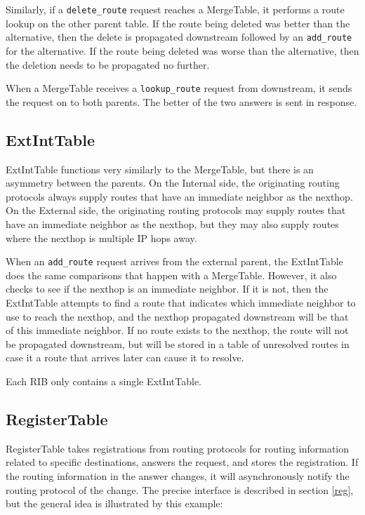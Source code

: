 \documentclass[11pt]{article}
\begin{document}
Similarly, if a {\tt delete\_route} request reaches a MergeTable, it
performs a route lookup on the other parent table.  If the route being
deleted was better than the alternative, then the delete is propagated
downstream followed by an {\tt add\_route} for the alternative.  If the
route being deleted was worse than the alternative, then the deletion
needs to be propagated no further.

When a MergeTable receives a {\tt lookup\_route} request from
downstream, it sends the request on to both parents.  The better of
the two answers is sent in response.

\subsection{ExtIntTable}

ExtIntTable functions very similarly to the MergeTable, but there is
an asymmetry between the parents.  On the Internal side, the
originating routing protocols always supply routes that have an
immediate neighbor as the nexthop.  On the External side, the
originating routing protocols may supply routes that have an immediate
neighbor as the nexthop, but they may also supply routes where the
nexthop is multiple IP hops away.  

When an {\tt add\_route} request arrives from the external parent, the
ExtIntTable does the same comparisons that happen with a MergeTable.
However, it also checks to see if the nexthop is an immediate
neighbor.  If it is not, then the ExtIntTable attempts to find a route
that indicates which immediate neighbor to use to reach the nexthop,
and the nexthop propagated downstream will be that of this immediate
neighbor.  If no route exists to the nexthop, the route will not be
propagated downstream, but will be stored in a table of unresolved
routes in case it a route that arrives later can cause it to resolve.

Each RIB only contains a single ExtIntTable.

\subsection{RegisterTable}

RegisterTable takes registrations from routing protocols for routing
information related to specific destinations, answers the request, and
stores the registration.  If the routing information in the
answer changes, it will asynchronously notify the routing protocol of
the change.  The precise interface is described in section \ref{reg},
but the general idea is illustrated by this example:
\end{document}
